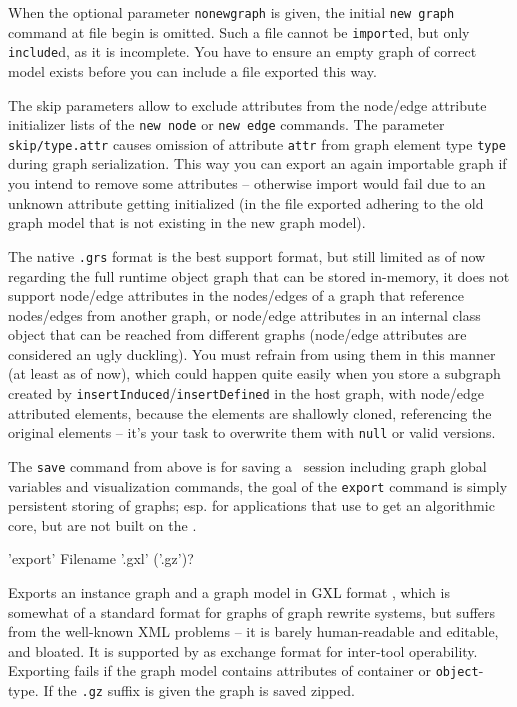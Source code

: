 When the optional parameter \texttt{nonewgraph} is given, the initial \texttt{new graph} command at file begin is omitted.
Such a file cannot be \texttt{import}ed, but only \texttt{include}d, as it is incomplete.
You have to ensure an empty graph of correct model exists before you can include a file exported this way.

The skip parameters allow to exclude attributes from the node/edge attribute initializer lists of the \texttt{new node} or \texttt{new edge} commands.
The parameter \texttt{skip/type.attr} causes omission of attribute \texttt{attr} from graph element type \texttt{type} during graph serialization.
This way you can export an again importable graph if you intend to remove some attributes -- otherwise import would fail due to an unknown attribute getting initialized (in the file exported adhering to the old graph model that is not existing in the new graph model).

The native \texttt{.grs} format is the best support format, but still limited as of now regarding the full runtime object graph that can be stored in-memory, it does not support node/edge attributes in the nodes/edges of a graph that reference nodes/edges from another graph, or node/edge attributes in an internal class object that can be reached from different graphs (node/edge attributes are considered an ugly duckling). You must refrain from using them in this manner (at least as of now), which could happen quite easily when you store a subgraph created by \texttt{insertInduced}/\texttt{insertDefined} in the host graph, with node/edge attributed elements, because the elements are shallowly cloned, referencing the original elements -- it's your task to overwrite them with \texttt{null} or valid versions.

The \texttt{save} command from above is for saving a \GrShell\ session including graph global variables and visualization commands,
the goal of the \texttt{export} command is simply persistent storing of graphs;
esp. for applications that use \GrG{ }to get an algorithmic core, but are not built on the \GrShell.

\begin{rail}
  'export' Filename '.gxl' ('.gz')?
\end{rail}
Exports an instance graph and a graph model in GXL format \cite{GXL,GXL2},
which is somewhat of a standard format for graphs of graph rewrite systems,
but suffers from the well-known XML problems -- it is barely human-readable and editable, and bloated.
It is supported by \GrG{} as exchange format for inter-tool operability.
Exporting fails if the graph model contains attributes of container or \texttt{object}-type.
If the \texttt{.gz} suffix is given the graph is saved zipped.

